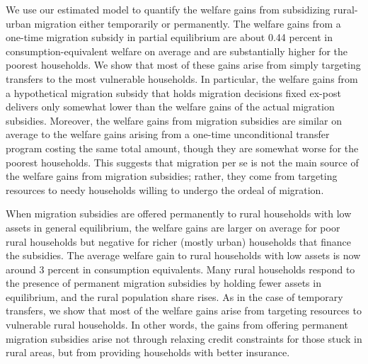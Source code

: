 \documentclass[12pt,pdftex]{article}
\begin{document}

We use our estimated model to quantify the welfare gains from subsidizing rural-urban migration either temporarily or permanently. The welfare gains from a one-time migration subsidy in partial equilibrium are about 0.44 percent in consumption-equivalent welfare on average and are substantially higher for the poorest households. We show that most of these gains arise from simply targeting transfers to the most vulnerable households. In particular, the welfare gains from a hypothetical migration subsidy that holds migration decisions fixed ex-post delivers only somewhat lower than the welfare gains of the actual migration subsidies. Moreover, the welfare gains from migration subsidies are similar on average to the welfare gains arising from a one-time unconditional transfer program costing the same total amount, though they are somewhat worse for the poorest households. This suggests that migration per se is not the main source of the welfare gains from migration subsidies; rather, they come from targeting resources to needy households willing to undergo the ordeal of migration.

When migration subsidies are offered permanently to rural households with low assets in general equilibrium, the welfare gains are larger on average for poor rural households but negative for richer (mostly urban) households that finance the subsidies. The average welfare gain to rural households with low assets is now around 3 percent in consumption equivalents. Many rural households respond to the presence of permanent migration subsidies by holding fewer assets in equilibrium, and the rural population share rises. As in the case of temporary transfers, we show that most of the welfare gains arise from targeting resources to vulnerable rural households. In other words, the gains from offering permanent migration subsidies arise not through relaxing credit constraints for those stuck in rural areas, but from providing households with better insurance.

\end{document}
